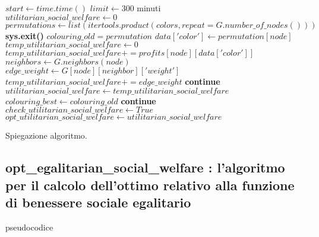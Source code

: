 \begin{algorithmic}

\State $start\gets time.time()$
\State $limit\gets 300$  minuti \\

\State $utilitarian\_social\_welfare\gets 0$
\State $permutations\gets list(itertools.product(colors, repeat=G.number\_of\_nodes()))$ \\

		\State \textbf{sys.exit()}
	\EndIf
	\State $colouring\_old = permutation$
		\State $data['color']\gets permutation[node]$
	\EndFor
	\State $temp\_utilitarian\_social\_welfare\gets 0$
		\State $temp\_utilitarian\_social\_welfare += profits[node][data['color']]$
		\State $neighbors\gets G.neighbors(node)$
				\State $edge\_weight\gets G[node][neighbor]['weight']$
				\State $temp\_utilitarian\_social\_welfare += edge\_weight$
			\Else
				\State \textbf{continue}
			\EndIf
		\EndFor
	\EndFor
		\State $utilitarian\_social\_welfare\gets temp\_utilitarian\_social\_welfare$
		\State $colouring\_best\gets colouring\_old$
	\Else
		\State \textbf{continue}
	\EndIf
\EndFor \\

\State $check\_utilitarian\_social\_welfare\gets True$
\State $opt\_utilitarian\_social\_welfare\gets utilitarian\_social\_welfare$ \\

\end{algorithmic} 

Spiegazione algoritmo.

\newpage
\subsection{opt\_egalitarian\_social\_welfare : l'algoritmo per il calcolo dell'ottimo relativo alla funzione di benessere sociale egalitario}
\justify
pseudocodice \\

